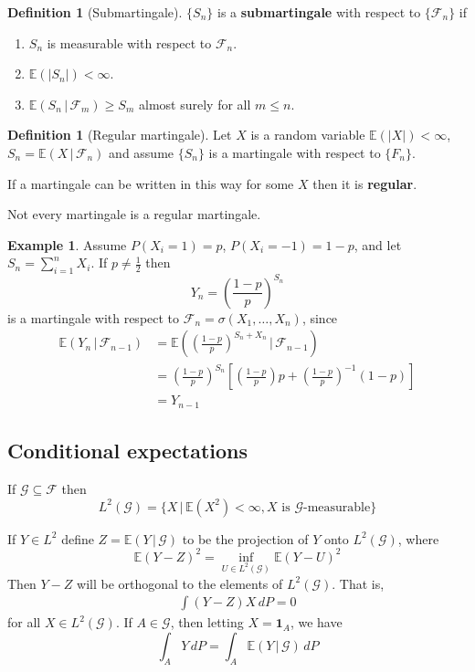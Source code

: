 \documentclass[10pt, oneside, reqno]{amsart}
\theoremstyle{plain}%
\theoremstyle{definition}
\newtheorem{defn}[thm]{Definition}
\newtheorem{exmp}[thm]{Example}
\theoremstyle{remark}
\newcommand{\given}{ \, | \,}
\newcommand{\sigf}{\mathcal{F}}
\newcommand{\E}{\mathbb{E}}
\newcommand{\sigg}{\mathcal{G}}
\begin{document}
\begin{defn}[Submartingale]
$\{ S_n \}$ is a \textbf{submartingale} with respect to $\{ \sigf_n \}$ if 
    \begin{enumerate}[(1)]
        \item $S_n$ is measurable with respect to $\sigf_n$. 
        \item $\E(|S_n|) < \infty$.
        \item $\E(S_n \, | \, \sigf_m) \geq S_m$ almost surely for all $m \leq n$. 
    \end{enumerate}
\end{defn}

\begin{defn}[Regular martingale]
    Let $X$ is a random variable $\E(|X|) < \infty$, $S_n = \E(X \, | \, \sigf_n)$ and assume $\{ S_n \}$ is a martingale with respect to $\{ F_n \}$.  
    
    If a martingale can be written in this way for some $X$ then it is \textbf{regular}.  
\end{defn}

Not every martingale is a regular martingale.  

\begin{exmp}
    Assume $P(X_i = 1) = p$, $P(X_i = -1) = 1-p$, and let $S_n = \sum_{i=1}^n X_i$.  If $p \neq \frac{1}{2}$ then \[
        Y_n = \left( \frac{1-p}{p} \right)^{S_n}
    \] is a martingale with respect to $\sigf_n = \sigma(X_1, \dots,X_n)$, since \begin{align*}
        \E(Y_n \, | \, \sigf_{n-1}) &= \E\left(\left( \frac{1-p}{p} \right)^{S_n + X_n} \, | \, \sigf_{n-1} \right) \\
        &= \left( \frac{1-p}{p} \right)^{S_n} \left[\left( \frac{1-p}{p} \right) p + \left(\frac{1-p}{p} \right)^{-1}(1-p) \right] \\
        &= Y_{n-1}
    \end{align*}
\end{exmp}

\subsection{Conditional expectations} %
\label{sub:conditional_expectations}
If $\sigg \subseteq \sigf$ then \[
    L^2(\sigg) = \{ X \, | \, \E(X^2) < \infty, \text{$X$ is $\sigg$-measurable} \}
\]

If $Y \in L^2$ define $Z = \E(Y \given \sigg)$ to be the projection of $Y$ onto $L^2(\sigg)$, where \[
    \E(Y-Z)^2 = \inf_{U \in L^2(\sigg)} \E(Y - U)^2
\] Then $Y-Z$ will be orthogonal to the elements of $L^2(\sigg)$.  That is, \begin{align*}
    \int (Y-Z) X \, dP = 0 
\end{align*} for all $X \in L^2(\sigg)$.  If $A \in \sigg$, then letting $X = \mathbf{1}_{A}$, we have \[ \boxed{
    \int_A Y \, dP = \int_A \E(Y \given \sigg) \, dP
}
\]
\end{document}
